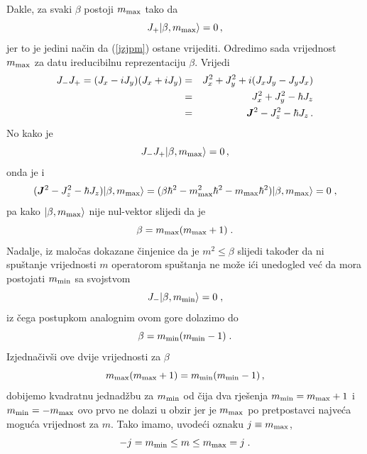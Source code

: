 Dakle, za svaki $\beta$ postoji $m_{\textrm{\scriptsize max}}$ tako da 
\begin{displaymath}
 J_+ | \beta, m_{\textrm{\scriptsize max}} \rangle = 0 \,,
\end{displaymath}
jer to je jedini način da (\ref{jzjpm}) ostane vrijediti.
Odredimo sada vrijednost $m_{\textrm{\scriptsize max}}$ za datu
ireducibilnu reprezentaciju $\beta$. Vrijedi
\begin{eqnarray*}
J_- J_+ =(J_x - i J_y)(J_x + i J_y)
   & = &J_{x}^2 + J_{y}^2 +i (J_x J_y - J_y J_x) \\
 & = & J_{x}^2 + J_{y}^2 - \hbar J_z \\
 & = & \jsq - J_{z}^2 - \hbar J_z \,.
\end{eqnarray*}
No kako je 
\begin{displaymath}
J_- J_+ | \beta, m_{\textrm{\scriptsize max}} \rangle = 0 \,,
\end{displaymath}
onda je i
\begin{displaymath}
 (\jsq - J_{z}^2 - \hbar J_z)\ket{\beta, m_{\textrm{\scriptsize max}}}
 = (\beta\hbar^2 - m_{\textrm{\scriptsize max}}^2 \hbar^2 
                 - m_{\textrm{\scriptsize max}}   \hbar^2 )
\ket{\beta, m_{\textrm{\scriptsize max}}} = 0 \;,
\end{displaymath}
pa kako $| \beta, m_{\textrm{\scriptsize max}} \rangle$ nije nul-vektor
slijedi da je
\begin{displaymath}
    \beta = m_{\textrm{\scriptsize max}} ( m_{\textrm{\scriptsize max}} +1)\;.
\end{displaymath}
Nadalje, iz maločas dokazane činjenice da je $m^2 \le \beta$ slijedi također
da ni spuštanje vrijednosti $m$ operatorom spuštanja ne može ići
unedogled već da mora postojati $m_{\textrm{\scriptsize min}}$
sa svojstvom
\begin{displaymath}
    J_- | \beta, m_{\textrm{\scriptsize min}} \rangle = 0 \;,
\end{displaymath}
iz čega postupkom analognim ovom gore dolazimo do
\begin{displaymath}
    \beta = m_{\textrm{\scriptsize min}} ( m_{\textrm{\scriptsize min}} -1)\;.
\end{displaymath}
Izjednačivši ove dvije vrijednosti za $\beta$ 
\begin{displaymath}
            m_{\textrm{\scriptsize max}} ( m_{\textrm{\scriptsize max}} +1)
= m_{\textrm{\scriptsize min}} ( m_{\textrm{\scriptsize min}} -1) \,,
\end{displaymath}
dobijemo kvadratnu jednadžbu za $m_{\textrm{\scriptsize min}}$ od čija
dva rješenja $m_{\textrm{\scriptsize min}}=m_{\textrm{\scriptsize max}}+1$
i $m_{\textrm{\scriptsize min}} = - m_{\textrm{\scriptsize max}}$ ovo
prvo ne dolazi u obzir jer je $m_{\textrm{\scriptsize max}}$ po pretpostavci
najveća moguća vrijednost za $m$. Tako imamo, uvodeći oznaku
$j\equiv m_{\textrm{\scriptsize max}}$,
\begin{displaymath}
               -j = m_{\textrm{\scriptsize min}} \le m \le 
 m_{\textrm{\scriptsize max}} = j   \;.
\end{displaymath}

